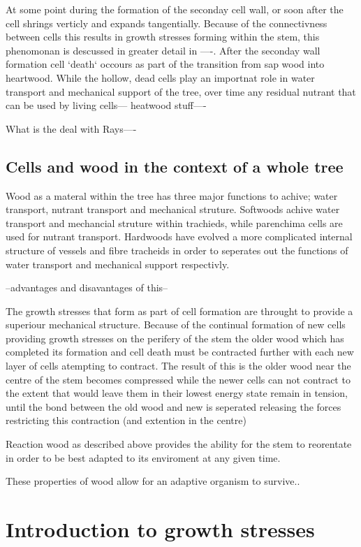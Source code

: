 \documentclass{article}
\begin{document}
At some point during the formation of the seconday cell wall, or soon after the
cell shrings verticly and expands tangentially. Because of the connectivness
between cells this results in growth stresses forming within the stem, this
phenomonan is descussed in greater detail in ----. After the seconday wall
formation cell `death` occours as part of the transition from sap wood into
heartwood. While the hollow, dead cells play an importnat role in water
transport and mechanical support of the tree, over time any residual nutrant
that can be used by living cells--- heatwood stuff----

What is the deal with Rays----

\subsection{Cells and wood in the context of a whole tree}
Wood as a materal within the tree has three major functions to achive; water
transport, nutrant transport and mechanical struture. Softwoods achive
water transport and mechancial struture within trachieds, while parenchima cells
are used for nutrant transport. Hardwoods have evolved a more complicated
internal structure of vessels and fibre tracheids in order to seperates out the
functions of water transport and mechanical support respectivly.

--advantages and disavantages of this--

The growth stresses that form as part of cell formation are throught to provide
a superiour mechanical structure. Because of the continual formation of new
cells providing growth stresses on the perifery of the stem the older wood which
has completed its formation and cell death must be contracted further with each
new layer of cells atempting to contract. The result of this is the older wood
near the centre of the stem becomes compressed while the newer cells can not
contract to the extent that would leave them in their lowest energy state
remain in tension, until the bond between the old wood and new is seperated
releasing the forces restricting this contraction (and extention in the centre)

Reaction wood as described above provides the ability for the stem to reorentate
in order to be best adapted to its enviroment at any given time.

These properties of wood allow for an adaptive organism to survive..

\section{Introduction to growth stresses}
\end{document}
